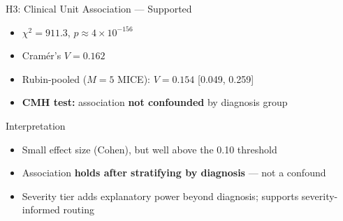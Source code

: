 \documentclass[aspectratio=169, 11pt]{beamer}
\begin{document}
\begin{frame}{H3: Clinical Unit Association --- \textcolor{green!60!black}{Supported}}
  \begin{itemize}
    \item $\chi^2 = 911.3$, $p \approx 4 \times 10^{-156}$
    \item Cram\'er's $V = 0.162$
    \item Rubin-pooled ($M{=}5$ MICE): $V = 0.154$ [0.049, 0.259]
    \item \textbf{CMH test:} association \textbf{not confounded} by diagnosis group
  \end{itemize}

  \vspace{0.5em}
  \begin{block}{Interpretation}
    \begin{itemize}
      \item Small effect size (Cohen), but well above the 0.10 threshold
      \item Association \textbf{holds after stratifying by diagnosis} --- not a confound
      \item Severity tier adds explanatory power beyond diagnosis; supports severity-informed routing
    \end{itemize}
  \end{block}
\end{frame}
\end{document}
